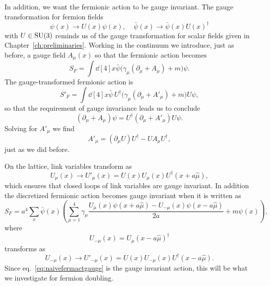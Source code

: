 In addition, we want the fermionic action to be gauge invariant. The
gauge transformation for fermion fields
\begin{equation}
  \psi(x)\to U(x)\psi(x),~~~~~\bar{\psi}(x)\to\bar{\psi}(x)U(x)^\dagger
\end{equation}
with $U\in\operatorname{SU}(3)$ reminds us of the gauge transformation for scalar 
fields given in Chapter~\ref{ch:preliminaries}. Working in the continuum 
we introduce, just as before, a gauge field $A_\mu(x)$ so that the 
fermionic action becomes
\begin{equation}
  S_F=\int\dd[4]{x}\bar{\psi}\big(\gamma_\mu(\partial_\mu+A_\mu)+m\big)\psi.
\end{equation}
The gauge-transformed fermionic action is
\begin{equation}
  S'_F=\int\dd[4]{x}\bar{\psi}\,U^\dagger
        \big(\gamma_\mu(\partial_\mu+A'_\mu)+m\big)U\psi,
\end{equation}
so that the requirement of gauge invariance leads us to conclude
\begin{equation}
  (\partial_\mu+A_\mu)\psi=U^\dagger(\partial_\mu+A'_\mu)U\psi.
\end{equation}
Solving for $A'_\mu$ we find
\begin{equation}
  A'_\mu=(\partial_\mu U)U^\dagger-UA_\mu U^\dagger,
\end{equation}
just as we did before.

On the lattice, link variables transform as
\begin{equation}
  U_\mu(x)\to U'_\mu(x)=U(x)U_\mu(x)U^\dagger(x+a\hat{\mu}),
\end{equation}
which ensures that closed loops of link variables are gauge invariant.
In addition the discretized fermionic action becomes gauge invariant
when it is written as
\begin{equation}\label{eq:naivefermactgauge}
  S_F=a^4\sum_x\bar{\psi}(x)\left(\sum_{\mu=1}^4\gamma_\mu
       \frac{U_\mu(x)\psi(x+a\hat{\mu})-U_{-\mu}(x)\psi(x-a\hat{\mu})}{2a}
       +m\psi(x)\right),
\end{equation}
where
\begin{equation}
  U_{-\mu}(x)=U_\mu(x-a\hat{\mu})^\dagger
\end{equation}
transforms as
\begin{equation}
  U_{-\mu}(x)\to U'_{-\mu}(x)=U(x)U_{-\mu}(x)U^\dagger(x-a\hat{\mu}).
\end{equation}
Since eq.~\eqref{eq:naivefermactgauge} is the gauge invariant action,
this will be what we investigate for fermion doubling.

